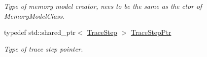 \begin{DoxyCompactItemize}
\begin{DoxyCompactList}\small\item\em Type of memory model creator, nees to be the same as the ctor of Memory\+Model\+Class. \end{DoxyCompactList}\item 
\mbox{\label{classilang_1_1_inter_ila_unroller_a3f08db6db6aac58581bad67ca778073e}} 
typedef std\+::shared\+\_\+ptr$<$ \mbox{\hyperlink{classilang_1_1_trace_step}{Trace\+Step}} $>$ \mbox{\hyperlink{classilang_1_1_inter_ila_unroller_a3f08db6db6aac58581bad67ca778073e}{Trace\+Step\+Ptr}}
\begin{DoxyCompactList}\small\item\em Type of trace step pointer. \end{DoxyCompactList}\end{DoxyCompactItemize}
